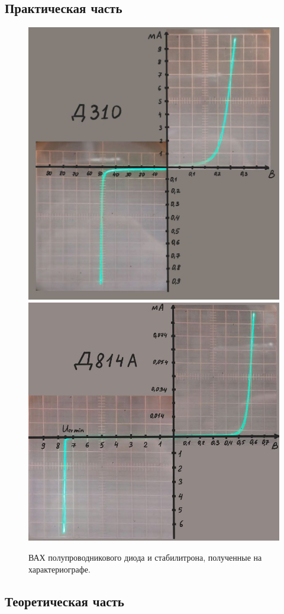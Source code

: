 \documentclass[a4paper, 12pt]{article}
\begin{document}
\subsection{Практическая часть}
\begin{figure}[h]
    \centering
    \includegraphics[width = 0.4\linewidth]{img/D310.jpg}
    \includegraphics[width = 0.46\linewidth]{img/D814.jpg}
    \caption{ВАХ полупроводникового диода и стабилитрона, полученные на характериографе.}
\end{figure}

\newpage
\subsection{Теоретическая часть}
\end{document}
